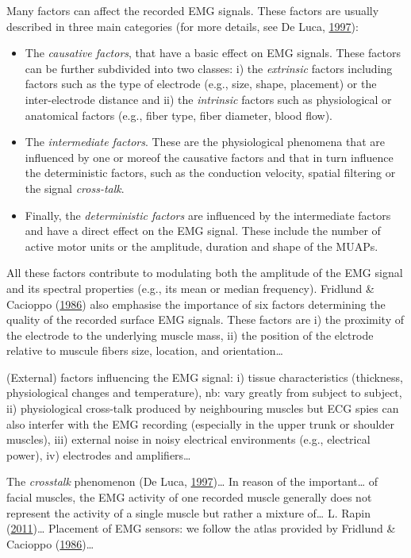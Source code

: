 \documentclass[a4paper,12pt,twoside,openright,oldfontcommands]{memoir}
\begin{document}
Many factors can affect the recorded EMG signals. These factors are
usually described in three main categories (for more details, see De
Luca, \protect\hyperlink{ref-de_luca_use_1997}{1997}):

\begin{itemize}
\item
  The \emph{causative factors}, that have a basic effect on EMG signals.
  These factors can be further subdivided into two classes: i) the
  \emph{extrinsic} factors including factors such as the type of
  electrode (e.g., size, shape, placement) or the inter-electrode
  distance and ii) the \emph{intrinsic} factors such as physiological or
  anatomical factors (e.g., fiber type, fiber diameter, blood flow).
\item
  The \emph{intermediate factors}. These are the physiological phenomena
  that are influenced by one or moreof the causative factors and that in
  turn influence the deterministic factors, such as the conduction
  velocity, spatial filtering or the signal \emph{cross-talk}.
\item
  Finally, the \emph{deterministic factors} are influenced by the
  intermediate factors and have a direct effect on the EMG signal. These
  include the number of active motor units or the amplitude, duration
  and shape of the MUAPs.
\end{itemize}

All these factors contribute to modulating both the amplitude of the EMG
signal and its spectral properties (e.g., its mean or median frequency).
Fridlund \& Cacioppo
(\protect\hyperlink{ref-fridlund_guidelines_1986}{1986}) also emphasise
the importance of six factors determining the quality of the recorded
surface EMG signals. These factors are i) the proximity of the electrode
to the underlying muscle mass, ii) the position of the elctrode relative
to muscule fibers size, location, and orientation\ldots{}

(External) factors influencing the EMG signal: i) tissue characteristics
(thickness, physiological changes and temperature), nb: vary greatly
from subject to subject, ii) physiological cross-talk produced by
neighbouring muscles but ECG spies can also interfer with the EMG
recording (especially in the upper trunk or shoulder muscles), iii)
external noise in noisy electrical environments (e.g., electrical
power), iv) electrodes and amplifiers\ldots{}

The \emph{crosstalk} phenomenon (De Luca,
\protect\hyperlink{ref-de_luca_use_1997}{1997})\ldots{} In reason of the
important\ldots{} of facial muscles, the EMG activity of one recorded
muscle generally does not represent the activity of a single muscle but
rather a mixture of\ldots{} L. Rapin
(\protect\hyperlink{ref-Rapin2011}{2011})\ldots{} Placement of EMG
sensors: we follow the atlas provided by Fridlund \& Cacioppo
(\protect\hyperlink{ref-fridlund_guidelines_1986}{1986})\ldots{}
\end{document}
